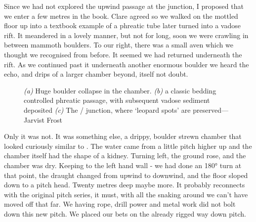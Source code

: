 Since we had not explored the upwind passage at the junction, I proposed that we enter a few metres in the book. Clare agreed so we walked on the mottled floor up into a textbook example of a phreatic tube later turned into a vadose rift. It meandered in a lovely manner, but not for long, soon we were crawling in between mammoth boulders. To our right, there was a small aven which we thought we recognised from before. It seemed we had returned underneath the  rift. As we continued past it underneath another enormous boulder we heard the echo, and drips of a larger chamber beyond,  itself not doubt.





\begin{figure}[t!]
\checkoddpage \ifoddpage \forcerectofloat \else \forceversofloat \fi
\centering
    \begin{subfigure}[t]{0.353\textwidth}
        \centering
        
        \caption{} \label{traverse over buckwheat}
    \end{subfigure}
        \hfill
\begin{subfigure}[t]{0.63\textwidth}
\centering
{}
 \caption{}\label{passage in Deja VU}
\end{subfigure}
    \vspace{0cm}
    \begin{subfigure}[t]{\textwidth}
    \centering
       
        \caption{} \label{Deja vu}
    \end{subfigure}
    \caption{
    \textit{(a)} Huge boulder collapse in the \protect{} chamber.  
     \textit{(b)} \protect{} a classic bedding controlled phreatic passage, with subsequent vadose sediment deposited
     \textit{(c)} The  \protect{}/ \protect{} junction, where `leopard spots' are preserved--- Jarvist Frost }
\end{figure}


Only it was not. It was something else, a drippy, boulder strewn chamber that looked curiously similar to . The water came from a little pitch higher up and the chamber itself had the shape of a kidney. Turning left, the ground rose, and the chamber was dry. Keeping to the left hand wall - we had done an 180° turn at that point, the draught changed from upwind to downwind, and the floor sloped down to a pitch head. Twenty metres deep maybe more. It probably reconnects with the original pitch series, it must, with all the snaking around we can't have moved off that far. We having rope, drill power and metal work did not bolt down this new pitch. We placed our bets on the already rigged way down  pitch. 

